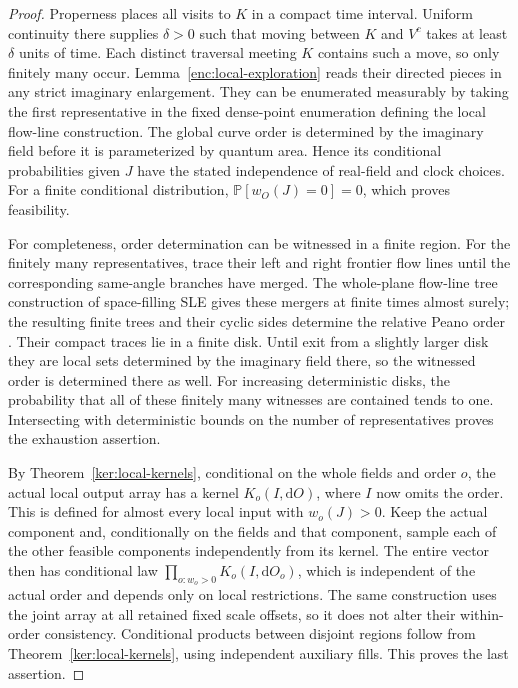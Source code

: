 \documentclass[11pt]{article}
\numberwithin{equation}{section}
\theoremstyle{definition}
\theoremstyle{remark}
\newcommand{\PP}{\mathbb P}
\newcommand{\dd}{\mathrm d}
\newcommand{\1}{\mathbf 1}
\begin{document}
\begin{proof}
Properness places all visits to \(K\) in a compact time interval.
Uniform continuity there supplies \(\delta>0\) such that moving
between \(K\) and \(V^c\) takes at least \(\delta\) units of time.
Each distinct traversal meeting \(K\) contains such a move, so only
finitely many occur.  Lemma~\ref{enc:local-exploration}
reads their directed pieces in any strict imaginary enlargement.
They can be enumerated measurably by taking the first representative
in the fixed dense-point enumeration defining the local flow-line
construction.  The global curve order is determined by the imaginary
field before it is parameterized by quantum area.  Hence its
conditional probabilities given \(J\) have the stated independence
of real-field and clock choices.  For a finite conditional distribution,
\(\PP[w_O(J)=0]=0\), which proves feasibility.

For completeness, order determination can be witnessed in a finite
region.  For the finitely many representatives, trace their left and
right frontier flow lines until the corresponding same-angle branches
have merged.  The whole-plane flow-line tree construction of
space-filling SLE gives these mergers at finite times almost surely;
the resulting finite trees and their cyclic sides determine the
relative Peano order \cite{MillerSheffieldIGIV}.  Their compact traces lie in a
finite disk.  Until exit from a slightly larger disk they are local
sets determined by the imaginary field there, so the witnessed order
is determined there as well.  For increasing deterministic disks,
the probability that all of these finitely many witnesses are
contained tends to one.  Intersecting with deterministic bounds on
the number of representatives proves the exhaustion assertion.

By Theorem~\ref{ker:local-kernels}, conditional on the whole fields
and order \(o\), the actual local output array has a kernel
\(K_o(I,\dd O)\), where \(I\) now omits the order.  This is defined
for almost every local input with \(w_o(J)>0\).  Keep the actual
component and, conditionally on the fields and that component,
sample each of the other feasible components independently from its
kernel.  The entire vector then has conditional law
\(\prod_{o:w_o>0}K_o(I,\dd O_o)\), which is independent of the actual
order and depends only on local restrictions.  The same construction
uses the joint array at all retained fixed scale offsets, so it does not
alter their within-order consistency.  Conditional products between
disjoint regions follow from Theorem~\ref{ker:local-kernels}, using
independent auxiliary fills.  This proves the last assertion.
\end{proof}
\end{document}
